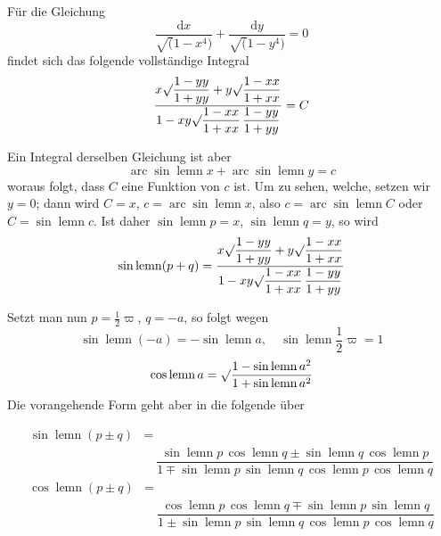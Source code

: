 Für die Gleichung
\[
\dfrac{\mathrm{d}x}{\surd(1-x^4)}+\dfrac{\mathrm{d}y}{\surd(1-y^4)}=0
\]
findet sich das folgende vollständige Integral
\[
\dfrac{x\surd\dfrac{1-yy}{1+yy}+y\surd\dfrac{1-xx}{1+xx}}
{1-xy\surd\dfrac{1-xx}{1+xx}\,\dfrac{1-yy}{1+yy}}=C
\]

Ein Integral derselben Gleichung ist aber
\[
\operatorname{arc}\sin\operatorname{lemn}x+\operatorname{arc}\sin\operatorname{lemn}y=c
\]
woraus folgt, dass $C$ eine Funktion von $c$ ist. Um zu sehen, welche, setzen wir $y=0$; dann wird $C=x$, $c=\operatorname{arc}\sin\operatorname{lemn}x$, also $c=\operatorname{arc}\sin\operatorname{lemn}C$ oder $C=\sin\operatorname{lemn}c$. Ist daher $\sin\operatorname{lemn}p=x$, $\sin\operatorname{lemn}q=y$, so wird
\[
\sin\operatorname{lemn}(p+q)=
\dfrac{x\surd\dfrac{1-yy}{1+yy}+y\surd\dfrac{1-xx}{1+xx}}
{1-xy\surd\dfrac{1-xx}{1+xx}\,\dfrac{1-yy}{1+yy}}
\]

Setzt man nun $p=\tfrac12\varpi$, $q=-a$, so folgt wegen
\[
\sin\operatorname{lemn}(-a)=-\sin\operatorname{lemn}a,\quad
\sin\operatorname{lemn}\dfrac12\varpi=1
\]
\[
\cos\operatorname{lemn}a=\surd\dfrac{1-\sin\operatorname{lemn}a^2}{1+\sin\operatorname{lemn}a^2}
\]
Die vorangehende Form geht aber in die folgende über


\[
\begin{aligned}\sin\operatorname{lemn}(p\pm q)&=\\[7pt]&\quad{}
\dfrac{\sin\operatorname{lemn}p\,\cos\operatorname{lemn}q\pm\sin\operatorname{lemn}q\,\cos\operatorname{lemn}p}
{1\mp\sin\operatorname{lemn}p\,\sin\operatorname{lemn}q\,\cos\operatorname{lemn}p\,\cos\operatorname{lemn}q}\end{aligned}
\]
\[
\begin{aligned}\cos\operatorname{lemn}(p\pm q)&=\\[7pt]&\quad{}
\dfrac{\cos\operatorname{lemn}p\,\cos\operatorname{lemn}q\mp\sin\operatorname{lemn}p\,\sin\operatorname{lemn}q}
{1\pm\sin\operatorname{lemn}p\,\sin\operatorname{lemn}q\,\cos\operatorname{lemn}p\,\cos\operatorname{lemn}q}\end{aligned}
\]


